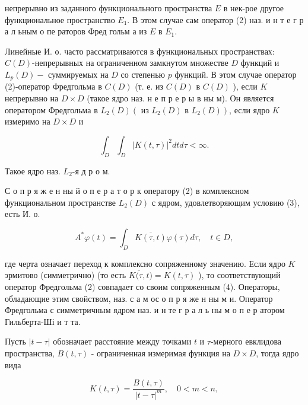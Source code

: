 \documentclass[10pt]{article}
\begin{document}
непрерывно из заданного функционального пространства $E$ в нек-рое другое функциональное пространство $E_{1}$. В этом случае сам оператор (2) наз. и н т е г р а л ьным о пе раторов Фред гольм а из $E$ в $E_{1}$.



Линейные И. о. часто рассматриваются в функциональных пространствах: $C(D)$-непрерывных на ограниченном замкнутом множестве $D$ функций и $L_{p}(D)-$ суммируемых на $D$ со степенью $p$ функций. В этом случае оператор (2)-оператор Фредгольма в $C(D)$ (т. е. из $C(D)$ в $C(D)$ ), если $K$ непрерывно на $D \times D$ (такое ядро наз. н е п р е р ы в ны м). Он является оператором Фредгольма в $L_{2}(D)\left(\right.$ из $L_{2}(D)$ в $\left.L_{2}(D)\right)$, если ядро $K$ измеримо на $D \times D$ и



\[

\int_{D} \int_{D}|K(t, \tau)|^{2} d t d \tau<\infty .

\]



Такое ядро наз. $L_{2}$-я д р о м.



С о п р я ж е н ны й о п е р а т о р к оператору (2) в комплексном функциональном пространстве $L_{2}(D)$ с ядром, удовлетворяющим условию (3), есть И. о.



\[

A^{*} \varphi(t)=\int_{D} \overline{K(\tau, t)} \varphi(\tau) d \tau, \quad t \in D,

\]



где черта означает переход к комплексно сопряженному значению. Если ядро $K$ эрмитово (симметрично) (то есть $\overline{K(\tau, t})=K(t, \tau)$ ), то соответствующий оператор Фредгольма (2) совпадает со своим сопряженным (4). Операторы, обладающие этим свойством, наз. с а м ос о п р я же н ны м и. Оператор Фредгольма с симметричным ядром наз. и н те г р а л ь ны м о п е р атором Гильберта-Ші и т та.



Пусть $|t-\tau|$ обозначает расстояние между точками $t$ и $\tau$-мерного евклидова пространства, $B(t, \tau)$ - ограниченная измеримая функция на $D \times D$, тогда ядро вида



\[

K(t, \tau)=\frac{B(t, \tau)}{|t-\tau|^{m}}, \quad 0<m<n,

\]
\end{document}
